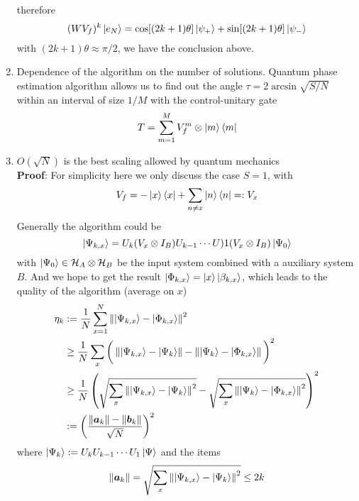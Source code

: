 \documentclass[11pt,a4paper]{article}%
\numberwithin{equation}{section}
\renewcommand*{\vec}[1]{\bm{#1}}%
\begin{document}
\begin{enumerate}
\begin{equation}
    \end{equation}
    therefore
    \begin{equation}
        (WV_f)^k\ket{e_N} = \cos[(2k+1)\theta]\ket{\psi_+} + \sin[(2k+1)\theta]\ket{\psi_-}
    \end{equation}
    with $(2k+1)\theta\approx\pi/2$, we have the conclusion above.
    \item Dependence of the algorithm on the number of solutions. Quantum phase estimation algorithm allows us to find out the angle $\tau = 2\arcsin\sqrt{S/N}$ within an interval of size $1/M$ with the control-unitary gate
    \begin{equation}
        T = \sum_{m=1}^MV^m_f\otimes\ket m\bra m
    \end{equation}
    \item $O(\sqrt N)$ is the best scaling allowed by quantum mechanics\\
    \textbf{Proof}: For simplicity here we only discuss the case $S=1$, with
    \begin{equation}
        V_f = -\ket x\bra x + \sum_{n\neq x}\ket n\bra n =: V_x
    \end{equation}
    Generally the algorithm could be
    \begin{equation}
        \ket{\Psi_{k,x}} = U_k(V_x\otimes I_B)U_{k-1}\cdots U)1(V_x\otimes I_B)\ket{\Psi_0}
    \end{equation}
    with $\ket{\Psi_0}\in\mathcal H_A\otimes \mathcal H_B$ be the input system combined with a auxiliary system $B$. And we hope to get the result $\ket{\Phi_{k,x}} = \ket x\ket{\beta_{k,x}}$, which leads to the quality of the algorithm (average on $x$)
    \begin{align}
        \eta_{k}&:=\frac 1N\sum_{x=1}^N\left\Vert\ket{\Psi_{k,x}}-\ket{\Phi_{k,x}}\right\Vert^2 \\
        &\ge \frac 1N\sum_x\bigg(\left\Vert\ket{\Psi_{k,x}}-\ket{\Psi_{k}}\right\Vert - \left\Vert\ket{\Psi_{k}}-\ket{\Phi_{k,x}}\right\Vert\bigg)^2 \\
        &\ge \frac 1N\left(\sqrt{\sum_x\left\Vert\ket{\Psi_{k,x}}-\ket{\Psi_{k}}\right\Vert^2} - \sqrt{\sum_x\left\Vert\ket{\Psi_{k}}-\ket{\Phi_{k,x}}\right\Vert^2}\right)^2 \\
        &:= \left(\frac{\Vert\vec a_k\Vert - \Vert \vec b_k\Vert}{\sqrt N}\right)^2
    \end{align}
    where $\ket{\Psi_k}:=U_k U_{k-1}\cdots U_1\ket\Psi$ and the items
    \begin{align}
        \Vert\vec a_k\Vert &= \sqrt{\sum_x\left\Vert\ket{\Psi_{k,x}}-\ket{\Psi_{k}}\right\Vert^2} \le 2k \\

\end{align}
\end{enumerate}
\end{document}
